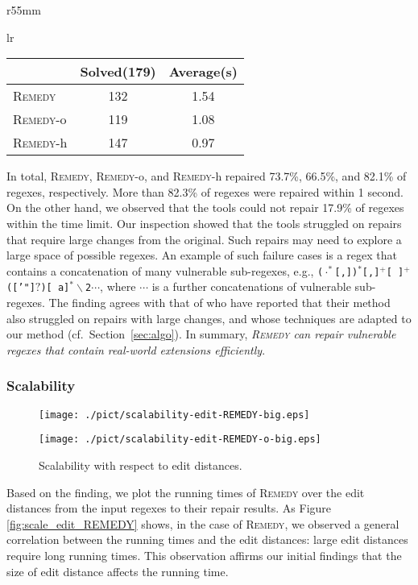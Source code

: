 \documentclass[conference]{IEEEtran}
\newcommand{\tool}{\textsc{Remedy}}
\newcommand{\any}{\cdot}
\newcommand{\tchanged}[2]{#2}
\begin{document}
\begin{wraptable}{r}{55mm}
\setlength\tabcolsep{1pt}
\begin{tabular}{lr}
\begin{tabular}{lcc}
          & {\bf Solved}(179) & {\bf Average}(s) \\ \hline
    \tool{}   & 132 & 1.54 \\
    \tool{}-o & 119 & 1.08 \\ \tool{}-h & 147 & 0.97 \\
\end{tabular}
\end{tabular}
\vspace{-0.3cm}
\end{wraptable}
In total, \tool{}, \tool{}-o, and \tool{}-h repaired 73.7\%, 66.5\%, and 82.1\% of regexes, respectively.
More than 82.3\% of regexes were repaired within 1 second.
On the other hand, we observed that the tools could not repair 17.9\% of regexes within the time limit.  Our inspection showed that the tools struggled on repairs that require large changes from the original.\tchanged{}{ Such repairs may need to explore a large space of possible regexes.
An example of such failure cases is a regex that contains a concatenation of many vulnerable sub-regexes, e.g., \texttt{($\any^*$[,])$^*$[,]$^+$[ ]$^+$(['"]$?$)[ a]$^*\backslash$2$\cdots$}, where $\cdots$ is a further concatenations of vulnerable sub-regexes.}
The finding agrees with that of \cite{10.1145/3360565} who have reported \tchanged{the same issue for their repair method}{that their method also struggled on repairs with large changes,} and whose techniques are adapted to our method (cf.~Section~\ref{sec:algo}).
In summary, {\em \tool{} can repair vulnerable regexes that contain real-world extensions efficiently}.





\subsubsection{Scalability}
\label{sec:scalability}
\begin{figure}[t]
 \begin{minipage}[b]{0.49\linewidth}
  \centering
\texttt{[image: ./pict/scalability-edit-REMEDY-big.eps]}  
  \subcaption{\tool{}}\label{fig:scale_edit_REMEDY}
 \end{minipage}
 \begin{minipage}[b]{0.49\linewidth}
  \centering
\texttt{[image: ./pict/scalability-edit-REMEDY-o-big.eps]} 
  \subcaption{\tool{}-o}\label{fig:scable_edit_REMEDY_o}
 \end{minipage} 
 \caption{Scalability with respect to edit distances.}\label{fig:scale_edit}
\end{figure}
Based on the finding, we plot the running times of \tool{} over the edit distances from the input regexes to their repair results.  
As Figure \ref{fig:scale_edit_REMEDY} shows, in the case of \tool{}, we observed a general correlation between the running times and the edit distances: large edit distances require long running times. This observation affirms our initial findings that the size of edit distance affects the running time.
\end{document}
